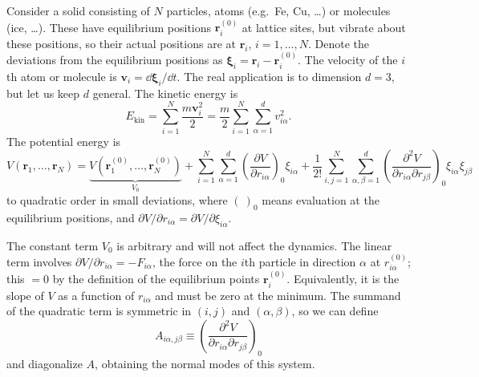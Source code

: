 Consider a solid consisting of $N$ particles, atoms (e.g.\ Fe, Cu, \ldots) or molecules (ice, \ldots). These have equilibrium positions
$\mathbf r_i^{(0)}$ at lattice sites, but vibrate about these positions, so their actual positions are at $\mathbf r_i$,
$i = 1,\ldots,N$. Denote the deviations from the equilibrium positions as $\boldsymbol\xi_i = \mathbf r_i-\mathbf r_i^{(0)}$. The
velocity of the $i$th atom or molecule is $\mathbf v_i = \dd\boldsymbol\xi_i/\dd t$. The real application is to dimension $d = 3$, but
let us keep $d$ general. The kinetic energy is
\begin{equation}
  E_{\text{kin}} = \sum_{i=1}^N\frac{m\mathbf v_i^2}{2} = \frac{m}{2}\sum_{i=1}^N\sum_{\alpha=1}^dv_{i\alpha}^2 .
\end{equation}
The potential energy is
\begin{equation}
  V(\mathbf r_1,\ldots,\mathbf r_N) = \underbrace{V(\mathbf r_1^{(0)},\ldots,\mathbf r_N^{(0)})}_{V_0}
  + \sum_{i=1}^N\sum_{\alpha=1}^d\left(\frac{\partial V}{\partial r_{i\alpha}}\right)_0\xi_{i\alpha}
  + \frac{1}{2!}\sum_{i,j=1}^N\sum_{\alpha,\beta=1}^d\left(\frac{\partial^2V}{\partial r_{i\alpha}\partial r_{j\beta}}\right)_0\xi_{i\alpha}\xi_{j\beta}
\end{equation}
to quadratic order in small deviations, where $(\ )_0$ means evaluation at the equilibrium positions, and
$\partial V/\partial r_{i\alpha} = \partial V/\partial\xi_{i\alpha}$.

The constant term $V_0$ is arbitrary and will not affect the dynamics. The linear term involves
$\partial V/\partial r_{i\alpha} = -F_{i\alpha}$, the force on the $i$th particle in direction $\alpha$ at
$r_{i\alpha}^{(0)}$; this $=0$ by the definition of the equilibrium points $\mathbf r_i^{(0)}$. Equivalently, it is the slope of $V$
as a function of $r_{i\alpha}$ and must be zero at the minimum. The summand of the quadratic term is symmetric in $(i,j)$ and
$(\alpha,\beta)$, so we can define
\begin{equation}
  A_{i\alpha,j\beta}\equiv\left(\frac{\partial^2V}{\partial r_{i\alpha}\partial r_{j\beta}}\right)_0
\end{equation}
and diagonalize $A$, obtaining the normal modes of this system.


